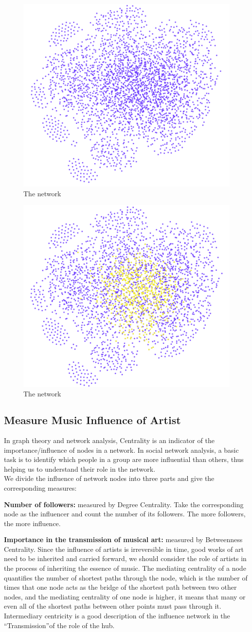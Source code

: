 \documentclass[conference]{IEEEtran}
\begin{document}
\begin{figure}[htbp]
	\centering
	\includegraphics[width=.3\textwidth]{./img/large_network1}
	\caption{The network}\label{fig:network}
\end{figure}
\begin{figure}[htbp]
	\centering
	\includegraphics[width=.3\textwidth]{./img/large_network2}
	\caption{The network}\label{fig:network}
\end{figure}
\subsection{Measure Music Influence of Artist}
In graph theory and network analysis, Centrality is an indicator of the importance/influence of nodes in a network. In social network analysis, a basic task is to identify which people in a group are more influential than others, thus helping us to understand their role in the network.\\
We divide the influence of network nodes into three parts and give the corresponding measures:

\textbf{Number of followers:} measured by Degree Centrality. Take the corresponding node as the influencer and count the number of its followers. The more followers, the more influence.

\textbf{Importance in the transmission of musical art:} measured by Betweenness Centrality. Since the influence of artists is irreversible in time, good works of art need to be inherited and carried forward, we should consider the role of artists in the process of inheriting the essence of music. The mediating centrality of a node quantifies the number of shortest paths through the node, which is the number of times that one node acts as the bridge of the shortest path between two other nodes, and the mediating centrality of one node is higher, it means that many or even all of the shortest paths between other points must pass through it. Intermediary centricity is a good description of the influence network in the “Transmission”of the role of the hub.
\end{document}
